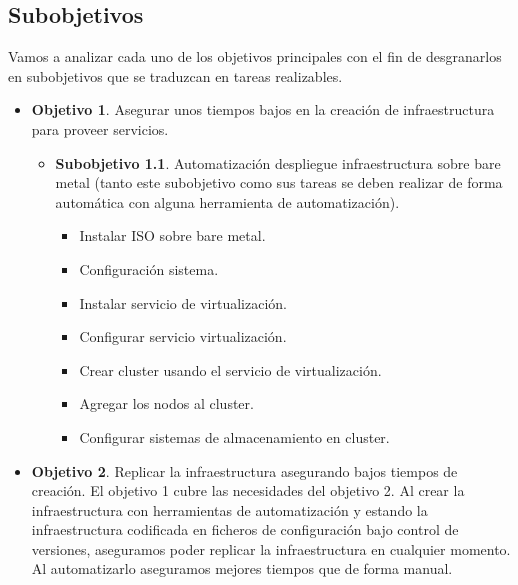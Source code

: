 	\subsection{Subobjetivos}
		\begin{text}
			Vamos a analizar cada uno de los objetivos principales con el fin de desgranarlos en subobjetivos que se traduzcan en tareas realizables. 
			\begin{itemize}
				\item \textbf{Objetivo 1}. Asegurar unos tiempos bajos en la creación de infraestructura para proveer servicios.
				\begin{itemize}
					\item \textbf{Subobjetivo 1.1}. Automatización despliegue infraestructura sobre bare metal (tanto este subobjetivo como sus tareas se deben realizar de forma automática con alguna herramienta de automatización).
					\begin{itemize}
						\item Instalar ISO sobre bare metal.
						\item Configuración sistema.
						\item Instalar servicio de virtualización.
						\item Configurar servicio virtualización.
						\item Crear cluster usando el servicio de virtualización.
						\item Agregar los nodos al cluster.
						\item Configurar sistemas de almacenamiento en cluster.
					\end{itemize}
				\end{itemize}
				\item \textbf{Objetivo 2}. Replicar la infraestructura asegurando bajos tiempos de creación. El objetivo 1 cubre las necesidades del objetivo 2. Al crear la infraestructura con herramientas de automatización y estando la infraestructura codificada en ficheros de configuración bajo control de versiones, aseguramos poder replicar la infraestructura en cualquier momento. Al automatizarlo aseguramos mejores tiempos que de forma manual.
				

\end{itemize}
\end{text}
